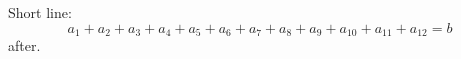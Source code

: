\documentclass[10pt]{article}
\begin{document}
Short line:
\begin{equation} a_1 + a_2 + a_3 + a_4 + a_5 + a_6 + a_7 + a_8 + a_9 + a_{10} + a_{11} + a_{12} = b \tag{long tag text} \end{equation}
after.
\end{document}
